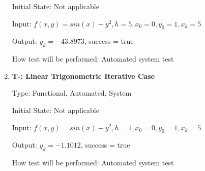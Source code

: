 \documentclass[12pt, titlepage]{article}
\newcounter{tnum} %
\begin{document}
\begin{enumerate}
Initial State: Not applicable
					
Input: $f(x, y) = sin(x) - y^2, h = 5, x_0 = 0, y_0 = 1, x_k = 5$
					
Output: $y_k = -43.8973$, success = true
					
How test will be performed: Automated system test

\item{\textbf{T-\thetnum \label{t-heun_nonlineariterative}: Linear Trigonometric Iterative Case}}

Type: Functional, Automated, System %
					
Initial State: Not applicable
					
Input: $f(x, y) = sin(x) - y^2, h = 1, x_0 = 0, y_0 = 1, x_k = 5$
					
Output: $y_k = -1.1012$, success = true
					
How test will be performed: Automated system test

\end{enumerate}
\end{document}
